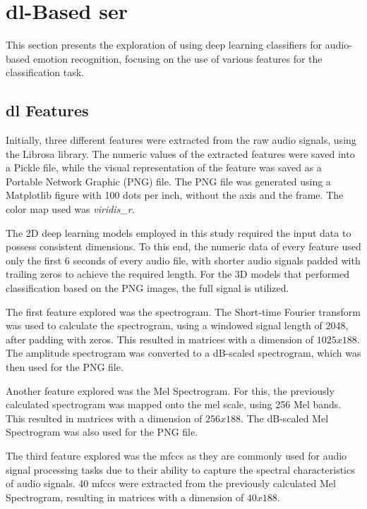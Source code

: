 
\section{\acl{dl}-Based \ac{ser}}

This section presents the exploration of using deep learning classifiers for audio-based emotion recognition, focusing on the use of various features for the classification task.

\subsection{\acl{dl} Features}

Initially, three different features were extracted from the raw audio signals, using the Librosa library. The numeric values of the extracted features were saved into a Pickle file, while the visual representation of the feature was saved as a Portable Network Graphic (PNG) file. The PNG file was generated using a Matplotlib figure with 100 dots per inch, without the axis and the frame. The color map used was \textit{viridis\_r}.

The 2D deep learning models employed in this study required the input data to possess consistent dimensions. To this end, the numeric data of every feature used only the first 6 seconds of every audio file, with shorter audio signals padded with trailing zeros to achieve the required length. For the 3D models that performed classification based on the PNG images, the full signal is utilized.

The first feature explored was the spectrogram. The Short-time Fourier transform was used to calculate the spectrogram, using a windowed signal length of 2048, after padding with zeros. This resulted in matrices with a dimension of $1025x188$. The amplitude spectrogram was converted to a dB-scaled spectrogram, which was then used for the PNG file.

Another feature explored was the Mel Spectrogram. For this, the previously calculated spectrogram was mapped onto the mel scale, using 256 Mel bands. This resulted in matrices with a dimension of $256x188$. The dB-scaled Mel Spectrogram was also used for the PNG file.

The third feature explored was the \ac{mfccs} as they are commonly used for audio signal processing tasks due to their ability to capture the spectral characteristics of audio signals. 40 \ac{mfccs} were extracted from the previously calculated Mel Spectrogram, resulting in matrices with a dimension of $40x188$.

